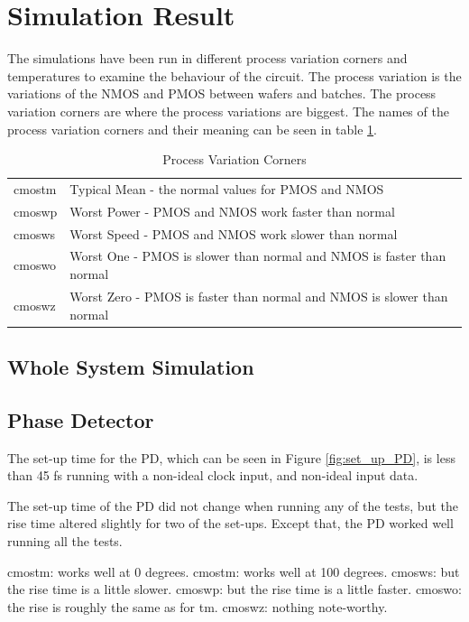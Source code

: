 \documentclass[a4paper,12pt]{article} \usepackage{graphicx}
\begin{document}
\section{Simulation Result}
The simulations have been run in different process variation corners and
temperatures to examine the behaviour of the circuit. The process variation is
the variations of the NMOS and PMOS between wafers and batches. 
The process variation corners are where the process variations are biggest.
The names of the process variation corners and their meaning can be seen in
table \ref{tab:corners}.

\begin{table}[h!]
        \centering
        \begin{tabular}{|l|l|}
                \hline 
                cmostm & Typical Mean - the normal values for PMOS and NMOS \\
                cmoswp & Worst Power - PMOS and NMOS work faster than normal \\
                cmosws & Worst Speed - PMOS and NMOS work slower than normal \\
                cmoswo & Worst One - PMOS is slower than normal and NMOS is
                faster than normal \\
                cmoswz & Worst Zero - PMOS is faster than normal and NMOS is
                slower than normal \\
                \hline
        \end{tabular}
        \caption{Process Variation Corners}
        \label{tab:corners}
\end{table}

\subsection{Whole System Simulation}
\subsection{Phase Detector}
The set-up time for the PD, which can be seen in Figure \ref{fig:set_up_PD}, is less than 45 fs
running with a non-ideal clock input, and non-ideal input data.

The set-up time of the PD did not change when running any of the tests, but the rise time altered slightly
for two of the set-ups. Except that, the PD worked well running all the tests.

cmostm: works well at 0 degrees.
cmostm: works well at 100 degrees.
cmosws: but the rise time is a little slower.
cmoswp: but the rise time is a little faster.
cmoswo: the rise is roughly the same as for tm.
cmoswz: nothing note-worthy.
\end{document}
